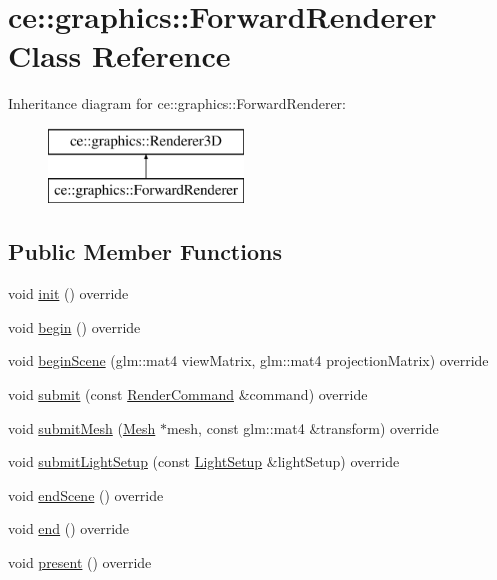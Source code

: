 \hypertarget{classce_1_1graphics_1_1_forward_renderer}{}\section{ce\+:\+:graphics\+:\+:Forward\+Renderer Class Reference}
\label{classce_1_1graphics_1_1_forward_renderer}
Inheritance diagram for ce\+:\+:graphics\+:\+:Forward\+Renderer\+:\begin{figure}[H]
\begin{center}
\leavevmode
\includegraphics[height=2.000000cm]{classce_1_1graphics_1_1_forward_renderer}
\end{center}
\end{figure}
\subsection*{Public Member Functions}
\begin{DoxyCompactItemize}
\item 
void \hyperlink{classce_1_1graphics_1_1_forward_renderer_ac6c7ad9a18ecfb2cbb6aee202e7e2e8f}{init} () override
\item 
void \hyperlink{classce_1_1graphics_1_1_forward_renderer_a4550120dc1349b5298de4a02422c6c26}{begin} () override
\item 
void \hyperlink{classce_1_1graphics_1_1_forward_renderer_a218629cfc8ee0f776589956f12ce9441}{begin\+Scene} (glm\+::mat4 view\+Matrix, glm\+::mat4 projection\+Matrix) override
\item 
void \hyperlink{classce_1_1graphics_1_1_forward_renderer_a3fb15f85368a78834b9d25b98461916c}{submit} (const \hyperlink{structce_1_1graphics_1_1_render_command}{Render\+Command} \&command) override
\item 
void \hyperlink{classce_1_1graphics_1_1_forward_renderer_abfb5f86e8b5c6a1824ab7a03838785fd}{submit\+Mesh} (\hyperlink{classce_1_1graphics_1_1_mesh}{Mesh} $\ast$mesh, const glm\+::mat4 \&transform) override
\item 
void \hyperlink{classce_1_1graphics_1_1_forward_renderer_a32c92d13c2ba951f71552ea9cf15350c}{submit\+Light\+Setup} (const \hyperlink{structce_1_1graphics_1_1_light_setup}{Light\+Setup} \&light\+Setup) override
\item 
void \hyperlink{classce_1_1graphics_1_1_forward_renderer_a34bf60e44a9a594ab596f46ca7688e3e}{end\+Scene} () override
\item 
void \hyperlink{classce_1_1graphics_1_1_forward_renderer_a8a8c16a645e63fd54b932f62d96d805b}{end} () override
\item 
void \hyperlink{classce_1_1graphics_1_1_forward_renderer_a19933a9015f2abbd27b398e7a6d697b6}{present} () override
\end{DoxyCompactItemize}
